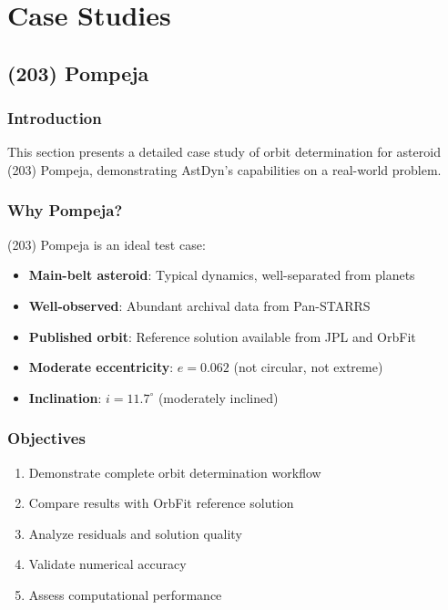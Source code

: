 \chapter{Case Studies}
\label{ch:case_studies}

\section{(203) Pompeja}
\label{sec:case_pompeja}

\subsection{Introduction}

This section presents a detailed case study of orbit determination for asteroid (203) Pompeja, demonstrating AstDyn's capabilities on a real-world problem.

\subsection{Why Pompeja?}

(203) Pompeja is an ideal test case:

\begin{itemize}
    \item \textbf{Main-belt asteroid}: Typical dynamics, well-separated from planets
    \item \textbf{Well-observed}: Abundant archival data from Pan-STARRS
    \item \textbf{Published orbit}: Reference solution available from JPL and OrbFit
    \item \textbf{Moderate eccentricity}: $e = 0.062$ (not circular, not extreme)
    \item \textbf{Inclination}: $i = 11.7^\circ$ (moderately inclined)
\end{itemize}

\subsection{Objectives}

\begin{enumerate}
    \item Demonstrate complete orbit determination workflow
    \item Compare results with OrbFit reference solution
    \item Analyze residuals and solution quality
    \item Validate numerical accuracy
    \item Assess computational performance
\end{enumerate}

